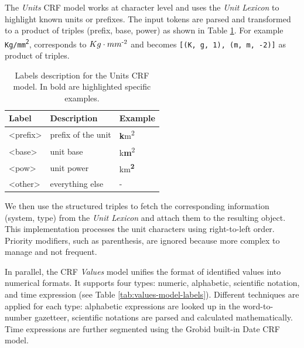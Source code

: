 \documentclass[sigconf]{acmart}
\begin{document}
The \textit{Units} CRF model works at character level and uses the \textit{Unit Lexicon} to highlight known units or prefixes. The input tokens are parsed and transformed to a product of triples (prefix, base, power) as shown in Table \ref{tab:units-model-labels}. For example \texttt{Kg/mm\textsuperscript{2}}, corresponds to \texttt{$Kg\cdot mm\textsuperscript{-2}$} and becomes \texttt{[(K, g, 1), (m, m, -2)]} as product of triples. 

\begin{table}[ht]
  \caption{Labels description for the Units CRF model. In bold are highlighted specific examples. }
  \label{tab:units-model-labels}
  \begin{tabular}{lll}
    \toprule
    Label & Description & Example\\
    \midrule
    <prefix> & prefix of the unit  & \textbf{k}m\textsuperscript{2} \\
    <base> & unit base & k\textbf{m}\textsuperscript{2}\\
    <pow> & unit power & km\textsuperscript{\textbf{2}}\\
    <other> & everything else & - \\
  \bottomrule
\end{tabular}
\end{table}

We then use the structured triples to fetch the corresponding information (system, type) from the \textit{Unit Lexicon} and attach them to the resulting object. 
This implementation processes the unit characters using right-to-left order. Priority modifiers, such as parenthesis, are ignored because more complex to manage and not frequent. 

In parallel, the CRF \textit{Values} model unifies the format of identified values into numerical formats. It supports four types: numeric, alphabetic, scientific notation, and time expression (see Table \ref{tab:values-model-labels}). Different techniques are applied for each type: alphabetic expressions are looked up in the word-to-number gazetteer, scientific notations are parsed and calculated mathematically. Time expressions are further segmented using the Grobid built-in Date CRF model.
\end{document}

